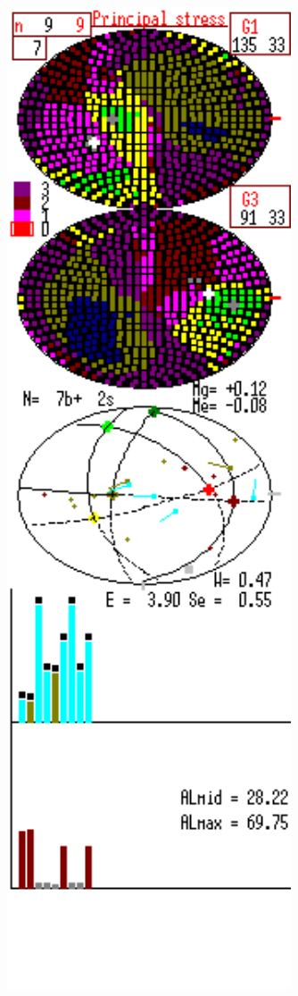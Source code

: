 \begin{figure}[H]
\begin{changemargin}{0cm}{0cm}
\begin{center}
\begin{minipage}[h]{0.33\linewidth}
\begin{center}
              \includegraphics[width=0.75\textwidth]{authors/kondratev-fig3.png}
      \end{center}


\end{minipage}
\end{center}
\end{changemargin}
\end{figure}
